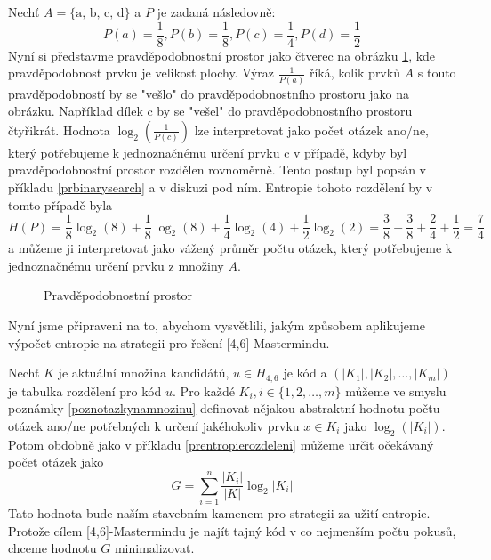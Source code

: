 \begin{prikl}\label{prentropierozdeleni}
Nechť $A = \{ \text{a, b, c, d}\}$ a $P$ je zadaná následovně: 
\[P(a) = \frac{1}{8}, P(b) = \frac{1}{8}, P(c) = \frac{1}{4}, P(d) = \frac{1}{2}\]
Nyní si představme pravděpodobnostní prostor jako čtverec na obrázku \ref{prprostor}, kde pravděpodobnost prvku je velikost plochy. Výraz $\frac{1}{P(a)}$ říká, kolik prvků $A$ s touto pravděpodobností by se "vešlo" do pravděpodobnostního prostoru jako na obrázku. Například dílek c by se "vešel" do pravděpodobnostního prostoru čtyřikrát.
Hodnota $\log_2\left(\frac{1}{P(c)}\right)$ lze interpretovat jako počet otázek ano/ne, který potřebujeme k jednoznačnému určení prvku c v případě, kdyby byl pravděpodobnostní prostor rozdělen rovnoměrně. Tento postup byl popsán v příkladu \ref{prbinarysearch} a v diskuzi pod ním.
Entropie tohoto rozdělení by v tomto případě byla 
\[H(P) = \frac{1}{8}\log_2 (8) + \frac{1}{8}\log_2 (8) + \frac{1}{4}\log_2 (4) + \frac{1}{2}\log_2 (2) = \frac{3}{8} + \frac{3}{8} + \frac{2}{4} + \frac{1}{2} = \frac{7}{4}\]
a můžeme ji interpretovat jako vážený průměr počtu otázek, který potřebujeme k jednoznačnému určení prvku z množiny $A$. 


\begin{figure}
\caption{Pravděpodobnostní prostor}
\label{prprostor}
\end{figure}

\end{prikl}

Nyní jsme připraveni na to, abychom vysvětlili, jakým způsobem aplikujeme výpočet entropie na strategii pro řešení [4,6]-Mastermindu.

Nechť $K$ je aktuální množina kandidátů, $u \in H_{4,6}$ je kód a $(|K_1|, |K_2|,\dots, |K_m|)$ je tabulka rozdělení pro kód $u$. Pro každé $K_i, i \in \{1, 2, \dots, m\}$ můžeme ve smyslu poznámky \ref{poznotazkynamnozinu} definovat nějakou abstraktní hodnotu počtu otázek ano/ne potřebných k určení jakéhokoliv prvku  $x \in K_i$ jako $\log_2(|K_i|)$. Potom obdobně jako v příkladu \ref{prentropierozdeleni} můžeme určit očekávaný počet otázek jako
\[G = \sum_{i =1}^n \frac{|K_i|}{|K|}\log_2|K_i| \]
Tato hodnota bude naším stavebním kamenem pro strategii za užití entropie. Protože cílem [4,6]-Mastermindu je najít tajný kód v co nejmenším počtu pokusů, chceme hodnotu $G$ minimalizovat. 

